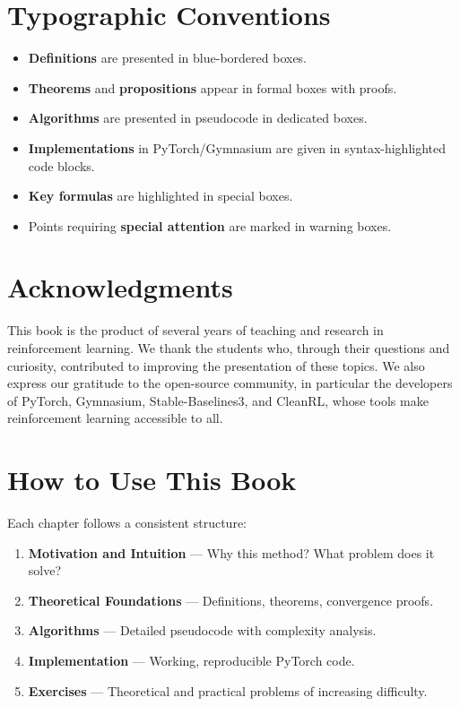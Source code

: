 \section*{Typographic Conventions}

\begin{itemize}
    \item \textbf{Definitions} are presented in blue-bordered boxes.
    \item \textbf{Theorems} and \textbf{propositions} appear in formal boxes with proofs.
    \item \textbf{Algorithms} are presented in pseudocode in dedicated boxes.
    \item \textbf{Implementations} in PyTorch/Gymnasium are given in syntax-highlighted
    code blocks.
    \item \textbf{Key formulas} are highlighted in special boxes.
    \item Points requiring \textbf{special attention} are marked in warning boxes.
\end{itemize}

\section*{Acknowledgments}

This book is the product of several years of teaching and research in reinforcement
learning. We thank the students who, through their questions and curiosity,
contributed to improving the presentation of these topics. We also express our
gratitude to the open-source community, in particular the developers of PyTorch,
Gymnasium, Stable-Baselines3, and CleanRL, whose tools make reinforcement
learning accessible to all.

\section*{How to Use This Book}

\begin{intuition}
Each chapter follows a consistent structure:
\begin{enumerate}
    \item \textbf{Motivation and Intuition} --- Why this method? What problem does
    it solve?
    \item \textbf{Theoretical Foundations} --- Definitions, theorems, convergence proofs.
    \item \textbf{Algorithms} --- Detailed pseudocode with complexity analysis.
    \item \textbf{Implementation} --- Working, reproducible PyTorch code.
    \item \textbf{Exercises} --- Theoretical and practical problems of increasing
    difficulty.
\end{enumerate}
\end{intuition}

